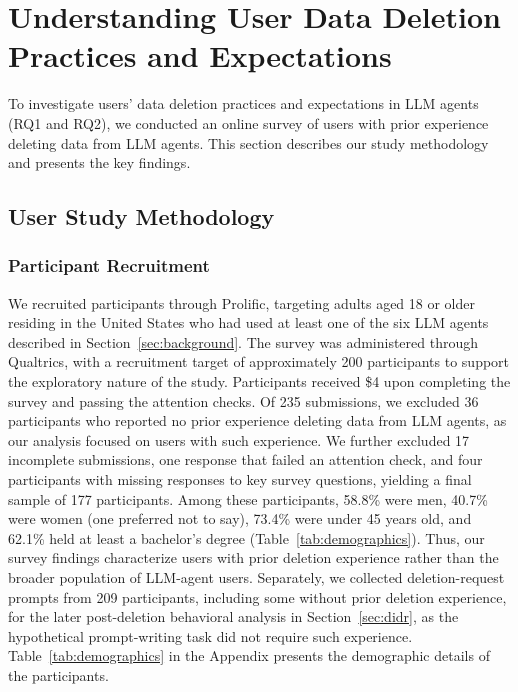 \section{Understanding User Data Deletion Practices and Expectations}
\label{sec:user_study}

To investigate users' data deletion practices and expectations in LLM agents (RQ1 and RQ2), we conducted an online survey of users with prior experience deleting data from LLM agents.
%
This section describes our study methodology and presents the key findings.

\subsection{User Study Methodology}

\subsubsection{Participant Recruitment}
%
We recruited participants through Prolific, targeting adults aged 18 or older residing in the United States who had used at least one of the six LLM agents described in Section~\ref{sec:background}. 
%
The survey was administered through Qualtrics, with a recruitment target of approximately 200 participants to support the exploratory nature of the study.
%
Participants received \$4 upon completing the survey and passing the attention checks.
%
Of 235 submissions, we excluded 36 participants who reported no prior experience deleting data from LLM agents, as our analysis focused on users with such experience. 
%
We further excluded 17 incomplete submissions, one response that failed an attention check, and four participants with missing responses to key survey questions, yielding a final sample of 177 participants.
%
Among these participants, 58.8\% were men, 40.7\% were women (one preferred not to say), 73.4\% were under 45 years old, and 62.1\% held at least a bachelor's degree (Table~\ref{tab:demographics}). 
%
Thus, our survey findings characterize users with prior deletion experience rather than the broader population of LLM-agent users.
%
Separately, we collected deletion-request prompts from 209 participants, including some without prior deletion experience, for the later post-deletion behavioral analysis in Section~\ref{sec:didr}, as the hypothetical prompt-writing task did not require such experience.
%
Table~\ref{tab:demographics} in the Appendix presents the demographic details of the participants.

